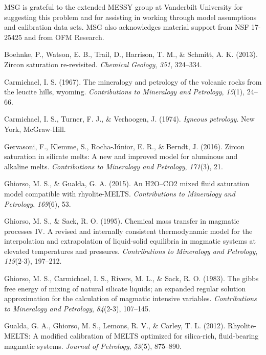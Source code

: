 \documentclass[
]{agujournal2019}
\newlength{\cslhangindent}
\newenvironment{CSLReferences}[2] %
 {\begin{list}{}{%
  \setlength{\itemindent}{0pt}
  \setlength{\leftmargin}{0pt}
  \setlength{\parsep}{0pt}
  \ifodd #1
   \setlength{\leftmargin}{\cslhangindent}
   \setlength{\itemindent}{-1\cslhangindent}
  \fi
  \setlength{\itemsep}{#2\baselineskip}}}
 {\end{list}}
\begin{document}
MSG is grateful to the extended MESSY group at Vanderbilt University for
suggesting this problem and for assisting in working through model
assumptions and calibration data sets. MSG also acknowledges material
support from NSF 17-25425 and from OFM Research.

\label{refs}
\begin{CSLReferences}{1}{0}
Boehnke, P., Watson, E. B., Trail, D., Harrison, T. M., \& Schmitt, A.
K. (2013). Zircon saturation re-revisited. \emph{Chemical Geology},
\emph{351}, 324--334.

Carmichael, I. S. (1967). The mineralogy and petrology of the volcanic
rocks from the leucite hills, wyoming. \emph{Contributions to Mineralogy
and Petrology}, \emph{15}(1), 24--66.

Carmichael, I. S., Turner, F. J., \& Verhoogen, J. (1974). \emph{Igneous
petrology}. New York, McGraw-Hill.

Gervasoni, F., Klemme, S., Rocha-Júnior, E. R., \& Berndt, J. (2016).
Zircon saturation in silicate melts: A new and improved model for
aluminous and alkaline melts. \emph{Contributions to Mineralogy and
Petrology}, \emph{171}(3), 21.

Ghiorso, M. S., \& Gualda, G. A. (2015). An H2O--CO2 mixed fluid
saturation model compatible with rhyolite-MELTS. \emph{Contributions to
Mineralogy and Petrology}, \emph{169}(6), 53.

Ghiorso, M. S., \& Sack, R. O. (1995). Chemical mass transfer in
magmatic processes IV. A revised and internally consistent thermodynamic
model for the interpolation and extrapolation of liquid-solid equilibria
in magmatic systems at elevated temperatures and pressures.
\emph{Contributions to Mineralogy and Petrology}, \emph{119}(2-3),
197--212.

Ghiorso, M. S., Carmichael, I. S., Rivers, M. L., \& Sack, R. O. (1983).
The gibbs free energy of mixing of natural silicate liquids; an expanded
regular solution approximation for the calculation of magmatic intensive
variables. \emph{Contributions to Mineralogy and Petrology},
\emph{84}(2-3), 107--145.

Gualda, G. A., Ghiorso, M. S., Lemons, R. V., \& Carley, T. L. (2012).
Rhyolite-MELTS: A modified calibration of MELTS optimized for
silica-rich, fluid-bearing magmatic systems. \emph{Journal of
Petrology}, \emph{53}(5), 875--890.


\end{CSLReferences}
\end{document}
